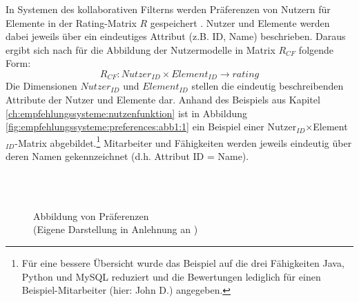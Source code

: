 In Systemen des kollaborativen Filterns werden Präferenzen von Nutzern für Elemente in der Rating-Matrix $R$ gespeichert \cite[S. 246ff.]{berkovsky:article}.
Nutzer und Elemente werden dabei jeweils über ein eindeutiges Attribut (z.B. ID, Name) beschrieben.
Daraus ergibt sich nach \textcite[S. 250]{berkovsky:article} für die Abbildung der Nutzermodelle in Matrix $R_{CF}$ folgende Form:
\begin{equation}\label{eq5}
    R_{CF}: Nutzer_{ID} \times Element_{ID} \rightarrow rating
\end{equation}
Die Dimensionen $Nutzer_{ID}$ und $Element_{ID}$ stellen die eindeutig beschreibenden Attribute der Nutzer und Elemente dar.
Anhand des Beispiels aus Kapitel \ref{ch:empfehlungssysteme:nutzenfunktion} ist in Abbildung \ref{fig:empfehlungssysteme:preferences:abb1:1} ein Beispiel einer Nutzer$_{ID}$$\times$Element$_{ID}$-Matrix abgebildet.\footnote{Für eine bessere Übersicht wurde das Beispiel auf die drei Fähigkeiten Java, Python und MySQL reduziert und die Bewertungen lediglich für einen Beispiel-Mitarbeiter (hier: John D.) angegeben.}
Mitarbeiter und Fähigkeiten werden jeweils eindeutig über deren Namen gekennzeichnet (d.h. Attribut ID = Name).

\begin{figure}[H]
    \centering
    \\
    \\
  \caption[Abbildung von Präferenzen]{Abbildung von Präferenzen\\
	(Eigene Darstellung in Anlehnung an \cite[S. 198]{adomavicius:3:inbook})}\label{fig:empfehlungssysteme:preferences:abb1}
\end{figure}


